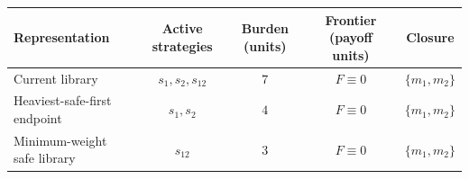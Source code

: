 \begin{tabular}{@{}lcccc@{}}
\toprule
Representation & Active strategies & Burden (units) & Frontier (payoff units) & Closure \\
\midrule
Current library & \(s_{1},s_{2},s_{12}\) & \(7\) & \(F\equiv0\) & \(\{m_{1},m_{2}\}\) \\
Heaviest-safe-first endpoint & \(s_{1},s_{2}\) & \(4\) & \(F\equiv0\) & \(\{m_{1},m_{2}\}\) \\
Minimum-weight safe library & \(s_{12}\) & \(3\) & \(F\equiv0\) & \(\{m_{1},m_{2}\}\) \\
\bottomrule
\end{tabular}
